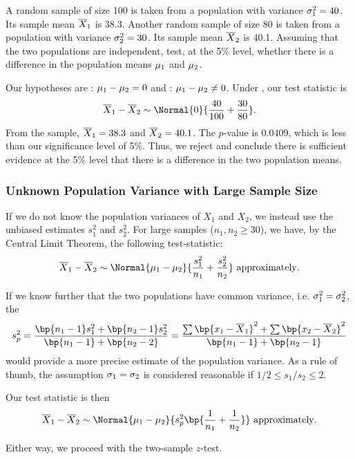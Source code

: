 \begin{sample}
    A random sample of size 100 is taken from a population with variance $\sigma_1^2 = 40$. Its sample mean $\overline{X}_1$ is 38.3. Another random sample of size 80 is taken from a population with variance $\sigma_2^2 = 30$. Its sample mean $\overline{X}_2$ is 40.1. Assuming that the two populations are independent, test, at the 5\% level, whether there is a difference in the population means $\mu_1$ and $\mu_2$.
\end{sample}
\begin{sampans}
    Our hypotheses are \nullhyp: $\mu_1 - \mu_2 = 0$ and \althyp: $\mu_1 - \mu_2 \neq 0$. Under \nullhyp, our test statistic is \[\ol{X}_1 - \ol{X}_2 \sim \Normal{0}{\frac{40}{100} + \frac{30}{80}}.\] From the sample, $\overline{X}_1 = 38.3$ and $\overline{X}_2 = 40.1$. The $p$-value is $0.0409$, which is less than our significance level of 5\%. Thus, we reject \nullhyp{} and conclude there is sufficient evidence at the 5\% level that there is a difference in the two population means.
\end{sampans}

\subsubsection{Unknown Population Variance with Large Sample Size}

If we do not know the population variances of $X_1$ and $X_2$, we instead use the unbiased estimates $s_1^2$ and $s_2^2$. For large samples ($n_1, n_2 \geq 30$), we have, by the Central Limit Theorem, the following test-statistic: \[\ol{X}_1 - \ol{X}_2 \sim \Normal{\m_1 - \m_2}{\frac{s_1^2}{n_1} + \frac{s_2^2}{n_2}} \text{ approximately}.\]

If we know further that the two populations have common variance, i.e. $\sigma_1^2 = \sigma_2^2$, the  \[s_p^2 = \frac{\bp{n_1-1} s_1^2 + \bp{n_2 - 1} s_2^2}{\bp{n_1 - 1} + \bp{n_2 - 2}} = \frac{\sum \bp{x_1 - \ol{X}_1}^2 + \sum \bp{x_2 - \ol{X}_2}^2}{\bp{n_1 - 1} + \bp{n_2 - 1}}\] would provide a more precise estimate of the population variance. As a rule of thumb, the assumption $\sigma_1 = \sigma_2$ is considered reasonable if $1/2 \leq s_1/s_2 \leq 2$.

Our test statistic is then \[\ol{X}_1 - \ol{X}_2 \sim \Normal{\m_1 - \m_2}{s_p^2 \bp{\frac{1}{n_1} + \frac{1}{n_2}}} \text{ approximately}.\]

Either way, we proceed with the two-sample $z$-test.

